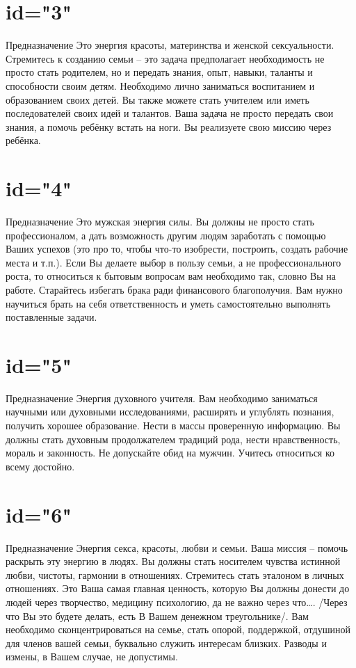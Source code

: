 \section{id="3"}{Предназначение}
Это энергия красоты, материнства и женской сексуальности. 
Стремитесь к созданию семьи – это задача предполагает необходимость 
не просто стать родителем, но и передать знания, опыт, навыки, 
таланты и способности своим детям.
Необходимо лично заниматься воспитанием и образованием своих детей. 
Вы также можете стать учителем или иметь последователей своих идей 
и талантов.
Ваша задача не просто передать свои знания, а помочь ребёнку 
встать на ноги. Вы реализуете свою миссию через ребёнка.
\endsection

\section{id="4"}{Предназначение}
Это мужская энергия силы. Вы должны не просто стать профессионалом, 
а дать возможность другим людям заработать с помощью Ваших успехов 
(это про то, чтобы что-то изобрести, построить, создать рабочие 
места и т.п.). Если Вы делаете выбор в пользу семьи, а не 
профессионального роста, то относиться к бытовым вопросам вам 
необходимо так, словно Вы на работе. Старайтесь избегать брака 
ради финансового благополучия.
Вам нужно научиться брать на себя ответственность и уметь 
самостоятельно выполнять поставленные задачи.
\endsection

\section{id="5"}{Предназначение}
Энергия духовного учителя.
Вам необходимо заниматься научными или духовными исследованиями, 
расширять и углублять познания, получить хорошее образование. 
Нести в массы проверенную информацию. Вы должны стать духовным 
продолжателем традиций рода, нести нравственность, мораль и 
законность.
Не допускайте обид на мужчин. Учитесь относиться ко всему достойно.
\endsection

\section{id="6"}{Предназначение}
Энергия секса, красоты, любви и семьи. Ваша миссия – помочь 
раскрыть эту энергию в людях. Вы должны стать носителем чувства 
истинной любви, чистоты, гармонии в отношениях. Стремитесь стать 
эталоном в личных отношениях.
Это Ваша самая главная ценность, которую Вы должны донести до 
людей через творчество, медицину психологию, да не важно через 
что…. /Через что Вы это будете делать, есть В Вашем денежном 
треугольнике/.
Вам необходимо сконцентрироваться на семье, стать опорой, 
поддержкой, отдушиной для членов вашей семьи, буквально служить 
интересам близких. Разводы и измены, в Вашем случае, не допустимы.
\endsection

